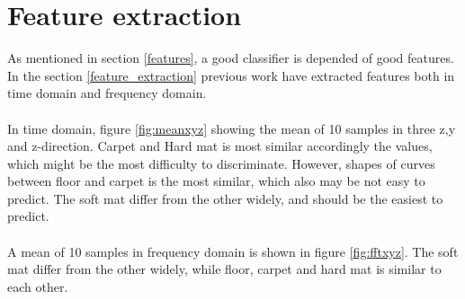 \documentclass[USenglish]{ifimaster}  %
\begin{document}
\section{Feature extraction}
As mentioned in section \ref{features}, a good classifier is depended of  good features. In the section \ref{feature_extraction} previous work have extracted features both in time domain and frequency domain. 
\\
\\
In time domain, figure \ref{fig:meanxyz} showing the mean of 10 samples in three z,y and z-direction. Carpet and Hard mat is most similar accordingly the values, which might be the most difficulty to discriminate. However, shapes of curves between floor and carpet is the most similar, which also may be not easy to predict. The soft mat differ from the other widely, and should be the easiest to predict. 
\\
\\
A mean of 10 samples in frequency domain is shown in figure \ref{fig:fftxyz}. The soft mat differ from the other widely, while floor, carpet and hard mat is similar to each other.
\end{document}
